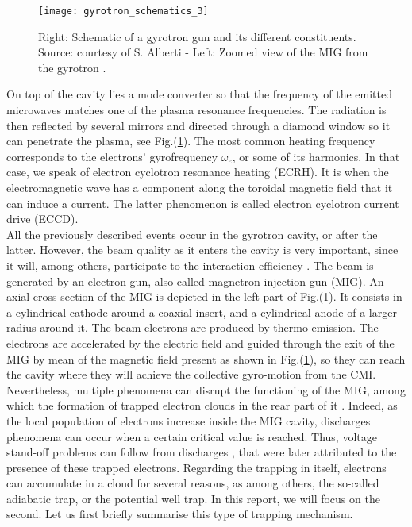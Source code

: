 \begin{figure}[h!]
\centering
	\texttt{[image: gyrotron\_schematics\_3]}
	\caption{\label{gyrotron} Right: Schematic of a gyrotron gun and its different constituents. Source: courtesy of S. Alberti - Left: Zoomed view of the MIG from the gyrotron \cite{TREX}.}
\end{figure}  

\noindent On top of the cavity lies a mode converter so that the frequency of the emitted microwaves matches one of the plasma resonance frequencies. The radiation is then reflected by several mirrors and directed through a diamond window so it can penetrate the plasma, see Fig.(\ref{gyrotron}). The most common heating frequency corresponds to the electrons' gyrofrequency $\omega_e$, or some of its harmonics. In that case, we speak of electron cyclotron resonance heating (ECRH). It is when the electromagnetic wave has a component along the toroidal magnetic field that it can induce a current. The latter phenomenon is called electron cyclotron current drive (ECCD).\\

All the previously described events occur in the gyrotron cavity, or after the latter. However, the beam quality as it enters the cavity is very important, since it will, among others, participate to the interaction efficiency \cite{Pagonakis}. The beam is generated by an electron gun, also called magnetron injection gun (MIG). An axial cross section of the MIG is depicted in the left part of Fig.(\ref{gyrotron}). It consists in a cylindrical cathode around a coaxial insert, and a cylindrical anode of a larger radius around it. The beam electrons are produced by thermo-emission. The electrons are accelerated by the electric field and guided through the exit of the MIG by mean of the magnetic field present as shown in Fig.(\ref{gyrotron}), so they can reach the cavity where they will achieve the collective gyro-motion from the CMI. Nevertheless, multiple phenomena can disrupt the functioning of the MIG, among which the formation of trapped electron clouds in the rear part of it \cite{Pagonakis, lebars_et_al}. Indeed, as the local population of electrons increase inside the MIG cavity, discharges phenomena can occur when a certain critical value is reached. Thus, voltage stand-off problems can follow from discharges \cite{ITER_gyrotron}, that were later attributed to the presence of these trapped electrons. Regarding the trapping in itself, electrons can accumulate in a cloud for several reasons, as among others, the so-called adiabatic trap, or the potential well trap. In this report, we will focus on the second. Let us first briefly summarise this type of trapping mechanism.\\

